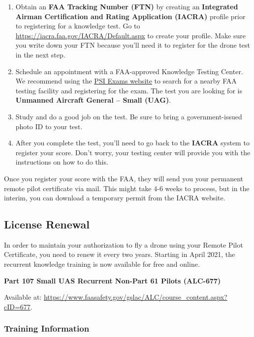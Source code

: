 \documentclass[
  12pt,
]{book}
\begin{document}
\begin{enumerate}
\def\labelenumi{\arabic{enumi}.}
\item
  Obtain an \textbf{FAA Tracking Number (FTN)} by creating an \textbf{Integrated Airman Certification and Rating Application (IACRA)} profile prior to registering for a knowledge test. Go to \url{https://iacra.faa.gov/IACRA/Default.aspx} to create your profile. Make sure you write down your FTN because you'll need it to register for the drone test in the next step.
\item
  Schedule an appointment with a FAA-approved Knowledge Testing Center. We recommend using the \href{https://faa.psiexams.com/faa/login}{PSI Exams website} to search for a nearby FAA testing facility and registering for the exam. The test you are looking for is \textbf{Unmanned Aircraft General -- Small (UAG)}.
\item
  Study and do a good job on the test. Be sure to bring a government-issued photo ID to your test.
\item
  After you complete the test, you'll need to go back to the \textbf{IACRA} system to register your score. Don't worry, your testing center will provide you with the instructions on how to do this.
\end{enumerate}

Once you register your score with the FAA, they will send you your permanent remote pilot certificate via mail. This might take 4-6 weeks to process, but in the interim, you can download a temporary permit from the IACRA website.

\hypertarget{license-renewal}{%
\subsection{License Renewal}\label{license-renewal}}

In order to maintain your authorization to fly a drone using your Remote Pilot Certificate, you need to renew it every two years. Starting in April 2021, the recurrent knowledge training is now available for free and online.

\textbf{Part 107 Small UAS Recurrent Non-Part 61 Pilots (ALC-677)}

Available at: \url{https://www.faasafety.gov/gslac/ALC/course_content.aspx?cID=677}.

\hypertarget{training-information}{%
\subsubsection{Training Information}\label{training-information}}
\end{document}
